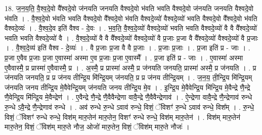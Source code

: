 \documentclass[17pt]{extarticle}
\begin{document}
18. ज॒न॒य॒ति॒ वै॒श्व॒दे॒वो वै᳚श्वदे॒वो ज॑नयति जनयति वैश्वदे॒वो भ॑वति भवति वैश्वदे॒वो ज॑नयति जनयति वैश्वदे॒वो भ॑वति । . वै॒श्व॒दे॒वो भ॑वति भवति वैश्वदे॒वो वै᳚श्वदे॒वो भ॑वति वैश्वदे॒व्यो॑ वैश्वदे॒व्यो॑ भवति वैश्वदे॒वो वै᳚श्वदे॒वो भ॑वति वैश्वदे॒व्यः॑ । . वै॒श्व॒दे॒व इति॑ वैश्व - दे॒वः । . भ॒व॒ति॒ वै॒श्व॒दे॒व्यो॑ वैश्वदे॒व्यो॑ भवति भवति वैश्वदे॒व्यो॑ वै वै वै᳚श्वदे॒व्यो॑ भवति भवति वैश्वदे॒व्यो॑ वै । . वै॒श्व॒दे॒व्यो॑ वै वै वै᳚श्वदे॒व्यो॑ वैश्वदे॒व्यो॑ वै प्र॒जाः प्र॒जा वै वै᳚श्वदे॒व्यो॑ वैश्वदे॒व्यो॑ वै प्र॒जाः । . वै॒श्व॒दे॒व्य॑ इति॑ वैश्व - दे॒व्यः॑ । . वै प्र॒जाः प्र॒जा वै वै प्र॒जाः । . प्र॒जाः प्र॒जाः । . प्र॒जा इति॑ प्र - जाः । . प्र॒जा ए॒वैव प्र॒जाः प्र॒जा ए॒वास्मा॑ अस्मा ए॒व प्र॒जाः प्र॒जा ए॒वास्मै᳚ । . प्र॒जा इति॑ प्र - जाः । . ए॒वास्मा॑ अस्मा ए॒वैवास्मै॒ प्र प्रास्मा॑ ए॒वैवास्मै॒ प्र । . अ॒स्मै॒ प्र प्रास्मा॑ अस्मै॒ प्र ज॑नयति जनयति॒ प्रास्मा॑ अस्मै॒ प्र ज॑नयति । . प्र ज॑नयति जनयति॒ प्र प्र ज॑नय तीन्द्रि॒य मि॑न्द्रि॒यम् ज॑नयति॒ प्र प्र ज॑नय तीन्द्रि॒यम् । . ज॒न॒य॒ ती॒न्द्रि॒य मि॑न्द्रि॒यम् ज॑नयति जनय तीन्द्रि॒य मे॒वैवेन्द्रि॒यम् ज॑नयति जनय तीन्द्रि॒य मे॒व । . इ॒न्द्रि॒य मे॒वैवेन्द्रि॒य मि॑न्द्रि॒य मे॒वैन्द्रे णै॒न्द्रे णै॒वेन्द्रि॒य मि॑न्द्रि॒य मे॒वैन्द्रेण॑ । . ए॒वैन्द्रे णै॒न्द्रे णै॒वैवैन्द्रेणा वावै॒न्द्रे णै॒वैवैन्द्रेणाव॑ । . ऐ॒न्द्रेणा वावै॒न्द्रे णै॒न्द्रेणाव॑ रुन्धे रु॒न्धे ऽवै॒न्द्रे णै॒न्द्रेणाव॑ रुन्धे । . अव॑ रुन्धे रु॒न्धे ऽवाव॑ रुन्धे॒ विशं॒ ॅविशꣳ॑ रु॒न्धे ऽवाव॑ रुन्धे॒ विश᳚म् । . रु॒न्धे॒ विशं॒ ॅविशꣳ॑ रुन्धे रुन्धे॒ विश॑म् मारु॒तेन॑ मारु॒तेन॒ विशꣳ॑ रुन्धे रुन्धे॒ विश॑म् मारु॒तेन॑ । . विश॑म् मारु॒तेन॑ मारु॒तेन॒ विशं॒ ॅविश॑म् मारु॒ते नौज॒ ओजो॑ मारु॒तेन॒ विशं॒ ॅविश॑म् मारु॒ते नौजः॑ । \newline
\end{document}
